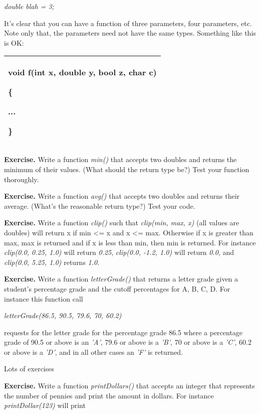 \documentclass[
]{article}
\begin{document}
\emph{double blah = 3;}

It's clear that you can have a function of three parameters, four
parameters, etc.\\

Note only that, the parameters need not have the same types. Something
like this is OK:

\begin{longtable}[]{@{}l@{}}
\toprule
\endhead
\begin{minipage}[t]{0.97\columnwidth}\raggedright
void f(int x, double y, bool z, char c)

\{

...

\}\strut
\end{minipage}\tabularnewline
\bottomrule
\end{longtable}

\textbf{Exercise. }Write a function \emph{min()} that accepts two
doubles and returns the minimum of their values. (What should the return
type be?) Test your function thoroughly.

\textbf{Exercise.} Write a function \emph{avg()} that accepts two
doubles and returns their average. (What's the reasonable return type?)
Test your code.

\textbf{Exercise.} Write a function \emph{clip()} such that
\emph{clip(min, max, x)} (all values are doubles) will return x if min
\textless= x and x \textless= max. Otherwise if x is greater than max,
max is returned and if x is less than min, then min is returned. For
instance \emph{clip(0.0, 0.25, 1.0)} will return \emph{0.25},
\emph{clip(0.0, -1.2, 1.0)} will return \emph{0.0}, and \emph{clip(0.0,
5.25, 1.0)} returns \emph{1.0}.

\textbf{Exercise.} Write a function \emph{letterGrade()} that returns a
letter grade given a student's percentage grade and the cutoff
percentages for A, B, C, D. For instance this function call

\emph{letterGrade(86.5, 90.5, 79.6, 70, 60.2)}

requests for the letter grade for the percentage grade 86.5 where a
percentage grade of 90.5 or above is an \emph{'A'}, 79.6 or above is a
\emph{'B'}, 70 or above is a \emph{'C'}, 60.2 or above is a \emph{'D'},
and in all other cases an \emph{'F'} is returned.

Lots of exercises

\textbf{Exercise.} Write a function \emph{printDollars()} that accepts
an integer that represents the number of pennies and print the amount in
dollars. For instance \emph{printDollar(123)} will print
\end{document}
